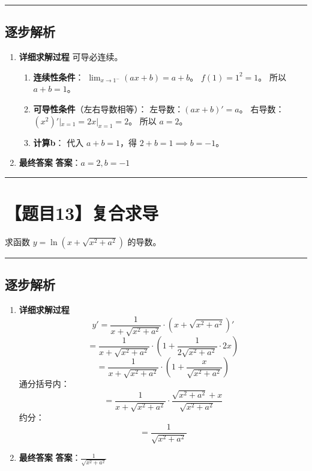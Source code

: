 \documentclass[UTF8]{ctexart}
\newenvironment{redenv}{\color{red}}{}
\newenvironment{detailedanalysis}{%
    \color{red}
    \begin{enumerate}[label=\textbf{第\arabic*步：}, leftmargin=*, align=left, itemsep=1.5ex]
}{%
    \end{enumerate}
}
\newcommand{\problemrule}{\noindent\rule{\textwidth}{1.5pt}\vspace{-0.8em}}
\newcommand{\analysisrule}{\noindent\rule{\textwidth}{0.8pt}\vspace{-0.8em}}
\begin{document}
\begin{redenv}
\analysisrule
\subsection*{逐步解析}

\begin{detailedanalysis}
\item \textbf{详细求解过程}
可导必连续。
\begin{enumerate}[label=(\arabic*)]
\item \textbf{连续性条件}：
$\lim_{x \to 1^-} (ax+b) = a+b$。
$f(1) = 1^2 = 1$。
所以 $a+b=1$。
\item \textbf{可导性条件}（左右导数相等）：
左导数：$(ax+b)' = a$。
右导数：$(x^2)'|_{x=1} = 2x|_{x=1} = 2$。
所以 $a=2$。
\item \textbf{计算b}：
代入 $a+b=1$，得 $2+b=1 \implies b=-1$。
\end{enumerate}

\item \textbf{最终答案}
\textbf{答案}：$ a=2, b=-1 $
\end{detailedanalysis}
\end{redenv}

\problemrule
\section*{【题目13】复合求导}
求函数 $ y = \ln(x + \sqrt{x^{2} + a^{2}}) $ 的导数。

\begin{redenv}
\analysisrule
\subsection*{逐步解析}

\begin{detailedanalysis}
\item \textbf{详细求解过程}
$$ y' = \frac{1}{x + \sqrt{x^2+a^2}} \cdot (x + \sqrt{x^2+a^2})' $$
$$ = \frac{1}{x + \sqrt{x^2+a^2}} \cdot (1 + \frac{1}{2\sqrt{x^2+a^2}} \cdot 2x) $$
$$ = \frac{1}{x + \sqrt{x^2+a^2}} \cdot (1 + \frac{x}{\sqrt{x^2+a^2}}) $$
通分括号内：
$$ = \frac{1}{x + \sqrt{x^2+a^2}} \cdot \frac{\sqrt{x^2+a^2} + x}{\sqrt{x^2+a^2}} $$
约分：
$$ = \frac{1}{\sqrt{x^2+a^2}} $$

\item \textbf{最终答案}
\textbf{答案}：$ \frac{1}{\sqrt{x^2+a^2}} $
\end{detailedanalysis}
\end{redenv}
\end{document}
